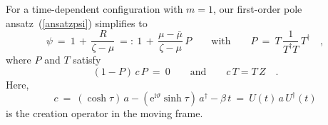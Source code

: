 \documentclass[a4paper,11pt]{article}
\numberwithin{equation}{section}
\def\b{\beta}
\def\e{\mbox{e}}
\def\i{\mbox{i}}
\newcommand{\adag}{a^{\dagger}}
\newcommand{\Tdag}{T^{\dagger}}
\begin{document}
\noindent

For a time-dependent configuration with $m{=}1$, our first-order pole
ansatz~(\ref{ansatzpsi}) simplifies to
\begin{equation} \label{movingpsi}
\psi\ =\ 1\,+\,\frac{R}{\zeta-\mu}\ =:\
1\,+\,\frac{\mu-\bar{\mu}}{\zeta-\mu}\,P
\qquad\textrm{with}\qquad
P\ =\ T\,\frac{1}{\Tdag T}\,\Tdag \quad,
\end{equation}
where $P$ and $T$ satisfy
\begin{equation} \label{movingP}
(1-P)\,c\,P\ =\ 0 \qquad\textrm{and}\qquad
c\,T = T\,Z \quad.
\end{equation}
Here,
\begin{equation} \label{movingc}
c\ =\ (\cosh\tau)\,a - (\e^{\i\vartheta}\sinh\tau)\,\adag - \b\,t
\ =\ U(t)\,a\,U^\dagger(t)
\end{equation}
is the creation operator in the moving frame.
\end{document}
